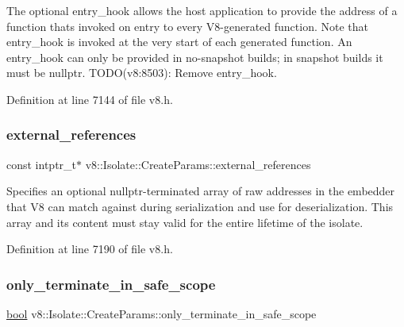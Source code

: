 The optional entry\+\_\+hook allows the host application to provide the address of a function that\textquotesingle{}s invoked on entry to every V8-\/generated function. Note that entry\+\_\+hook is invoked at the very start of each generated function. An entry\+\_\+hook can only be provided in no-\/snapshot builds; in snapshot builds it must be nullptr. T\+O\+D\+O(v8\+:8503)\+: Remove entry\+\_\+hook. 

Definition at line 7144 of file v8.\+h.

\mbox{\label{structv8_1_1Isolate_1_1CreateParams_a89b8c9dc74efbdcd93ab5786eae6fe19}} 
\subsubsection{\texorpdfstring{external\+\_\+references}{external\_references}}
{\footnotesize\ttfamily const intptr\+\_\+t$\ast$ v8\+::\+Isolate\+::\+Create\+Params\+::external\+\_\+references}

Specifies an optional nullptr-\/terminated array of raw addresses in the embedder that V8 can match against during serialization and use for deserialization. This array and its content must stay valid for the entire lifetime of the isolate. 

Definition at line 7190 of file v8.\+h.

\mbox{\label{structv8_1_1Isolate_1_1CreateParams_af44a854a07944452589128b6cf3b9958}} 
\subsubsection{\texorpdfstring{only\+\_\+terminate\+\_\+in\+\_\+safe\+\_\+scope}{only\_terminate\_in\_safe\_scope}}
{\footnotesize\ttfamily \mbox{\hyperlink{classbool}{bool}} v8\+::\+Isolate\+::\+Create\+Params\+::only\+\_\+terminate\+\_\+in\+\_\+safe\+\_\+scope}

